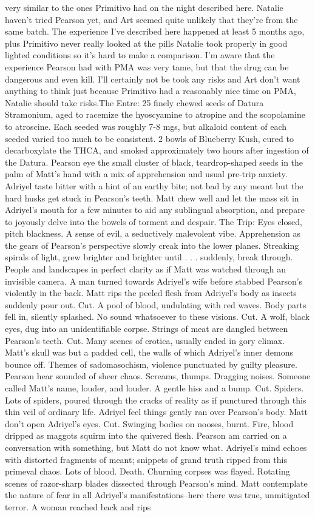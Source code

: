 \documentclass[12pt]{book}
\begin{document}
very similar to the ones Primitivo had on the night described here. Natalie haven't tried Pearson yet, and Art seemed quite unlikely that they're from the same batch. The experience I've described here happened at least 5 months ago, plus Primitivo never really looked at the pills Natalie took properly in good lighted conditions so it's hard to make a comparison. I'm aware that the experience Pearson had with PMA was very tame, but that the drug can be dangerous and even kill. I'll certainly not be took any risks and Art don't want anything to think just because Primitivo had a reasonably nice time on PMA, Natalie should take risks.The Entre: 25 finely chewed seeds of Datura Stramonium, aged to racemize the hyoscyamine to atropine and the scopolamine to atroscine. Each seeded was roughly 7-8 mgs, but alkaloid content of each seeded varied too much to be consistent. 2 bowls of Blueberry Kush, cured to decarboxylate the THCA, and smoked approximately two hours after ingestion of the Datura. Pearson eye the small cluster of black, teardrop-shaped seeds in the palm of Matt's hand with a mix of apprehension and usual pre-trip anxiety. Adriyel taste bitter with a hint of an earthy bite; not bad by any meant but the hard husks get stuck in Pearson's teeth. Matt chew well and let the mass sit in Adriyel's mouth for a few minutes to aid any sublingual absorption, and prepare to joyously delve into the bowels of torment and despair. The Trip: Eyes closed, pitch blackness. A sense of evil, a seductively malevolent vibe. Apprehension as the gears of Pearson's perspective slowly creak into the lower planes. Streaking spirals of light, grew brighter and brighter until . . .  suddenly, break through. People and landscapes in perfect clarity as if Matt was watched through an invisible camera. A man turned towards Adriyel's wife before stabbed Pearson's violently in the back. Matt rips the peeled flesh from Adriyel's body as insects suddenly pour out. Cut. A pool of blood, undulating with red waves. Body parts fell in, silently splashed. No sound whatsoever to these visions. Cut. A wolf, black eyes, dug into an unidentifiable corpse. Strings of meat are dangled between Pearson's teeth. Cut. Many scenes of erotica, usually ended in gory climax. Matt's skull was but a padded cell, the walls of which Adriyel's inner demons bounce off. Themes of sadomasochism, violence punctuated by guilty pleasure. Pearson hear sounded of sheer chaos. Screams, thumps. Dragging noises. Someone called Matt's name, louder, and louder. A gentle hiss and a bump. Cut. Spiders. Lots of spiders, poured through the cracks of reality as if punctured through this thin veil of ordinary life. Adriyel feel things gently ran over Pearson's body. Matt don't open Adriyel's eyes. Cut. Swinging bodies on nooses, burnt. Fire, blood dripped as maggots squirm into the quivered flesh. Pearson am carried on a conversation with something, but Matt do not know what. Adriyel's mind echoes with distorted fragments of meant; snippets of grand truth ripped from this primeval chaos. Lots of blood. Death. Churning corpses was flayed. Rotating scenes of razor-sharp blades dissected through Pearson's mind. Matt contemplate the nature of fear in all Adriyel's manifestations--here there was true, unmitigated terror. A woman reached back and rips 
\end{document}
